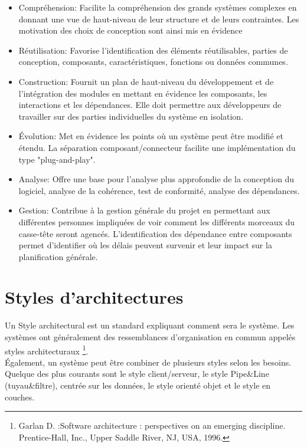 \documentclass[12pt, a4paper, openany]{report}
\begin{document}
  \begin{itemize}
      \item  Compréhension:
      Facilite la compréhension des grands systèmes complexes en donnant une vue de haut-niveau de leur structure et de leurs contraintes. 
      Les motivation des choix de conception sont ainsi mis en évidence
      \item  Réutilisation:
      Favorise l’identification des éléments réutilisables, parties de conception, composants, caractéristiques, fonctions ou données communes.
      \item  Construction:
      Fournit un plan de haut-niveau du développement et de l’intégration des modules en mettant en évidence les composants, les interactions et les dépendances. Elle doit permettre aux développeurs de travailler sur des parties individuelles du système en isolation.
      \item  Évolution:
      Met en évidence les points où un système peut être modifié et étendu. La séparation composant/connecteur facilite une implémentation du type "plug-and-play".
      \item  Analyse:
      Offre une base pour l’analyse plus approfondie de la conception du logiciel, analyse de la cohérence, test de conformité, analyse des dépendances.
      \item  Gestion:
      Contribue à la gestion générale du projet en permettant aux différentes personnes impliquées de voir comment les différents morceaux du casse-tête seront agencés. L’identification des dépendance entre composants permet d’identifier où les délais peuvent survenir et leur impact sur la planification générale.
  \end{itemize}
  
 \section{Styles d’architectures}
 Un Style architectural est un standard expliquant comment sera le système. Les systèmes ont généralement des ressemblances d’organisation en commun appelés styles architecturaux \cite{refbib4} \footnote{Garlan D. :Software architecture : perspectives on an emerging discipline. Prentice-Hall, Inc., Upper Saddle River, NJ, USA, 1996.}.\\
 
 Également, un système peut être combiner de plusieurs styles selon les besoins. Quelque des plus courants sont  le style client/serveur, le style Pipe\&Line (tuyau\&filtre), centrée sur les données, le style orienté objet et le style en couches.\\
 
\end{document}
